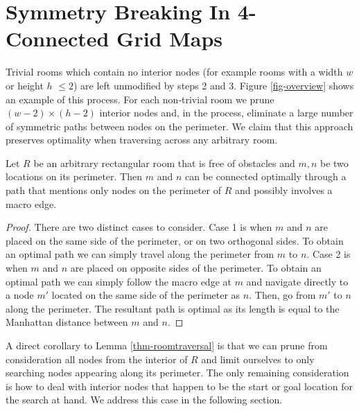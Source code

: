 \section{Symmetry Breaking In 4-Connected Grid Maps}
\label{sec::rsr::symm4c}

Trivial rooms which contain no interior nodes (for example rooms with a width $w$ or height $h$ 
$\leq 2$) are left unmodified by steps 2 and 3.
Figure \ref{fig-overview} shows an example of this process.
For each non-trivial room we prune $(w-2)\times(h-2)$ interior
nodes and, in the process, eliminate a large number of symmetric paths between 
nodes on the perimeter.
We claim that this approach preserves optimality when traversing across any arbitrary room.

\begin{lemma}
\label{thm-roomtraversal}
Let $R$ be an arbitrary rectangular room that is free of obstacles
and $m, n$ be two locations on its perimeter.
Then $m$ and $n$ can be connected optimally through a path that
mentions only nodes on the perimeter of $R$ and possibly involves
a macro edge.
\end{lemma}
\begin{proof}
\par
There are two distinct cases to consider.
Case 1 is when $m$ and $n$ are placed on the same side of the perimeter, or
on two orthogonal sides. 
To obtain an optimal path we can simply travel along the perimeter from $m$ to $n$.
Case 2 is when $m$ and $n$ are placed on opposite sides of the perimeter.
To obtain an optimal path we can simply follow the macro edge at $m$ 
and navigate directly to a node $m'$ located on
the same side of the perimeter as $n$. Then, go from $m'$ to $n$ along the perimeter.
The resultant path is optimal as its length is equal to the Manhattan distance between $m$ and $n$.
\end{proof}

A direct corollary to Lemma \ref{thm-roomtraversal} is that we can prune from consideration
all nodes from the interior of $R$ and limit ourselves to only searching nodes appearing along its perimeter. 
The only remaining consideration is how to deal with interior nodes that happen
to be the start or goal location for the search at hand.
We address this case in the following section.

